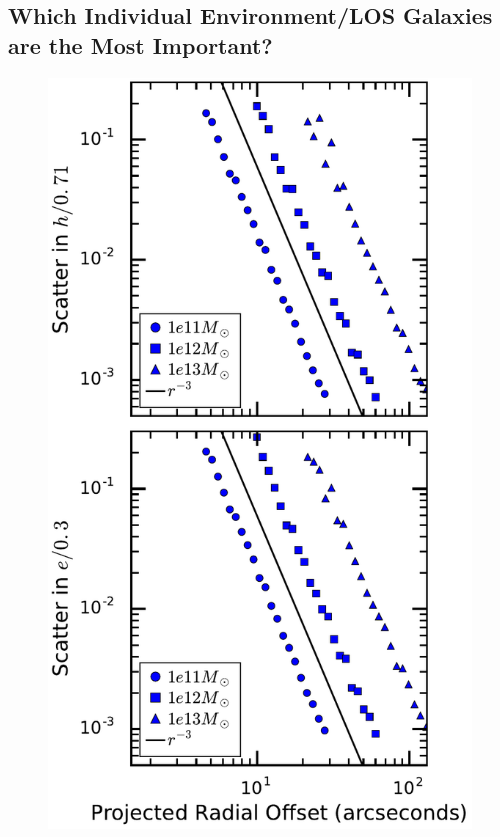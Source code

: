 \documentclass{emulateapj}
\begin{document}
\subsection{Which Individual Environment/LOS Galaxies are the Most Important?}
\label{sec:Individual}
\begin{figure}[t]
\begin{center}
\includegraphics[width=\columnwidth]{toymass_compare.pdf}

\end{center}
\end{figure}
\end{document}
